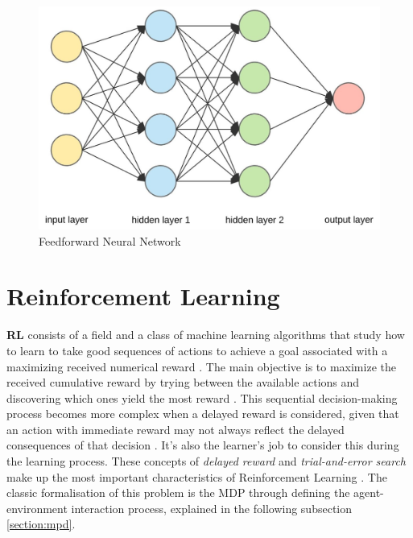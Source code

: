 \begin{figure}
	\centering
	\includegraphics[width=0.50\linewidth]{./figures/fnn.jpg}
	\caption{Feedforward Neural Network \cite{FeedforwardNeuralNetwork}}
	\label{fig:fnn}
\end{figure}


\section{Reinforcement Learning} \label{sec:rl}

\textbf{\ac{RL}} consists of a field and a class of machine learning algorithms that study how to learn to take good sequences of actions to achieve a goal associated with a maximizing received numerical reward \cite{brunskillCS234ReinforcementLearning}. The main objective is to maximize the received cumulative reward by trying between the available actions and discovering which ones yield the most reward \cite{suttonReinforcementLearningIntroduction2014}. This sequential decision-making process becomes more complex when a delayed reward is considered, given that an action with immediate reward may not always reflect the delayed consequences of that decision \cite{suttonReinforcementLearningIntroduction2014}. It's also the learner's job to consider this during the learning process. These concepts of \textit{delayed reward} and \textit{trial-and-error search} make up the most important characteristics of Reinforcement Learning \cite{suttonReinforcementLearningIntroduction2014}. The classic formalisation of this problem is the \ac{MDP} through defining the agent-environment interaction process, explained in the following subsection \ref{section:mpd}. \par 

